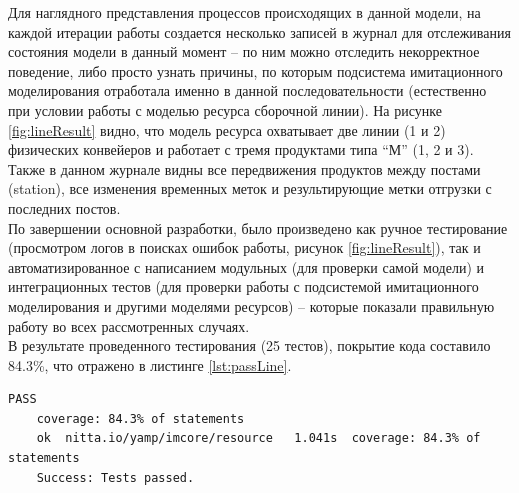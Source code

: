 \indent Для наглядного представления процессов происходящих в данной модели, на каждой итерации работы создается несколько записей в журнал для отслеживания состояния модели в данный момент -- по ним можно отследить некорректное поведение, либо просто узнать причины, по которым подсистема имитационного моделирования отработала именно в данной последовательности (естественно при условии работы с моделью ресурса сборочной линии).
На рисунке \ref{fig:lineResult} видно, что модель ресурса охватывает две линии (1 и 2) физических конвейеров и работает с тремя продуктами типа ``М'' (1, 2 и 3).
Также в данном журнале видны все передвижения продуктов между постами (station), все изменения временных меток и результирующие метки отгрузки с последних постов.\\
\indent По завершении основной разработки, было произведено как ручное тестирование (просмотром логов в поисках ошибок работы, рисунок \ref{fig:lineResult}), так и автоматизированное с написанием модульных (для проверки самой модели) и интеграционных тестов (для проверки работы с подсистемой имитационного моделирования и другими моделями ресурсов) -- которые показали правильную работу во всех рассмотренных случаях.\\

\indent В результате проведенного тестирования (25 тестов), покрытие кода составило 84.3\%, что отражено в листинге \ref{lst:passLine}.

\begin{lstlisting}[caption={Тестовое покрытие кода},label={lst:passLine}]
	PASS
	coverage: 84.3% of statements
	ok	nitta.io/yamp/imcore/resource	1.041s	coverage: 84.3% of statements
	Success: Tests passed.
\end{lstlisting}
